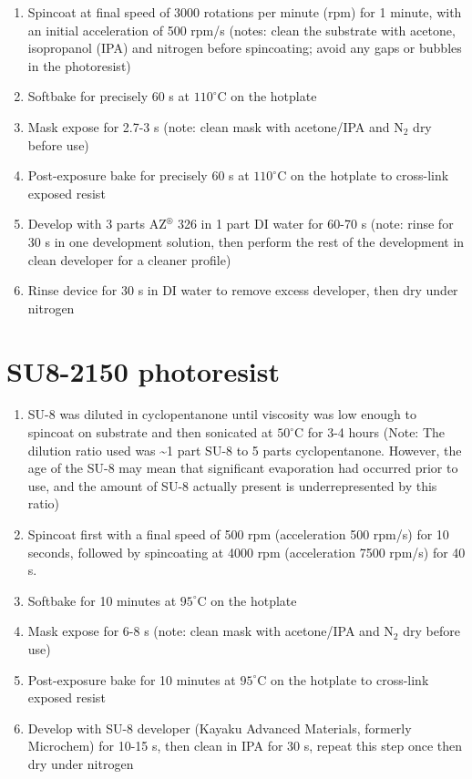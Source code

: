 \documentclass[
  a4paper,
]{scrbook}
\begin{document}
\begin{enumerate}
\def\labelenumi{\arabic{enumi}.}
\item
  Spincoat at final speed of 3000 rotations per minute (rpm) for 1
  minute, with an initial acceleration of 500 rpm/s (notes: clean the
  substrate with acetone, isopropanol (IPA) and nitrogen before
  spincoating; avoid any gaps or bubbles in the photoresist)
\item
  Softbake for precisely 60 s at \(110^\circ\)C on the hotplate
\item
  Mask expose for 2.7-3 s (note: clean mask with acetone/IPA and N\(_2\)
  dry before use)
\item
  Post-exposure bake for precisely 60 s at \(110^\circ\)C on the
  hotplate to cross-link exposed resist
\item
  Develop with 3 parts AZ\(^\circledR\) 326 in 1 part DI water for 60-70
  s (note: rinse for 30 s in one development solution, then perform the
  rest of the development in clean developer for a cleaner profile)
\item
  Rinse device for 30 s in DI water to remove excess developer, then dry
  under nitrogen
\end{enumerate}

\hypertarget{su8-2150-photoresist}{%
\section{SU8-2150 photoresist}\label{su8-2150-photoresist}}

\begin{enumerate}
\def\labelenumi{\arabic{enumi}.}
\item
  SU-8 was diluted in cyclopentanone until viscosity was low enough to
  spincoat on substrate and then sonicated at \(50^\circ\)C for 3-4
  hours (Note: The dilution ratio used was \textasciitilde1 part SU-8 to
  5 parts cyclopentanone. However, the age of the SU-8 may mean that
  significant evaporation had occurred prior to use, and the amount of
  SU-8 actually present is underrepresented by this ratio)
\item
  Spincoat first with a final speed of 500 rpm (acceleration 500 rpm/s)
  for 10 seconds, followed by spincoating at 4000 rpm (acceleration 7500
  rpm/s) for 40 s.
\item
  Softbake for 10 minutes at \(95^\circ\)C on the hotplate
\item
  Mask expose for 6-8 s (note: clean mask with acetone/IPA and N\(_2\)
  dry before use)
\item
  Post-exposure bake for 10 minutes at \(95^\circ\)C on the hotplate to
  cross-link exposed resist
\item
  Develop with SU-8 developer (Kayaku Advanced Materials, formerly
  Microchem) for 10-15 s, then clean in IPA for 30 s, repeat this step
  once then dry under nitrogen
\end{enumerate}
\end{document}
